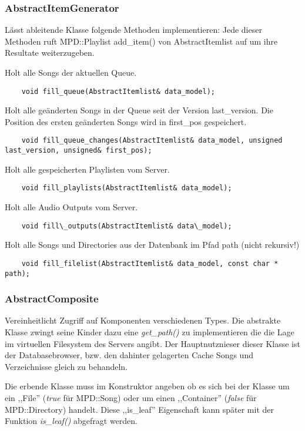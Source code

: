 
\subsubsection{AbstractItemGenerator}
Lässt ableitende Klasse folgende Methoden implementieren:
Jede dieser Methoden ruft MPD::Playlist add\_item() von AbstractItemlist auf um ihre Resultate weiterzugeben.

Holt alle Songs der aktuellen Queue.
\begin{verbatim}            
    void fill_queue(AbstractItemlist& data_model);
\end{verbatim}

Holt alle geänderten Songs in der Queue seit der Version last\_version. Die Position des ersten geänderten Songs wird in first\_pos gespeichert. 
\begin{verbatim}
    void fill_queue_changes(AbstractItemlist& data_model, unsigned last_version, unsigned& first_pos);
\end{verbatim}

Holt alle gespeicherten Playlisten vom Server.
\begin{verbatim}              
    void fill_playlists(AbstractItemlist& data_model);
\end{verbatim}

Holt alle Audio Outputs vom Server.
\begin{verbatim}
    void fill\_outputs(AbstractItemlist& data\_model);
\end{verbatim}

Holt alle Songs und Directories aus der Datenbank im Pfad path (nicht rekursiv!)              
\begin{verbatim}
    void fill_filelist(AbstractItemlist& data_model, const char * path);
\end{verbatim}



\subsubsection{AbstractComposite}
Vereinheitlicht Zugriff auf Komponenten verschiedenen Types.
Die abstrakte Klasse zwingt seine Kinder dazu eine \emph{get\_path()} zu implementieren die die Lage im virtuellen Filesystem des Servers angibt.
Der Hauptnutznieser dieser Klasse ist der Databasebrowser, bzw. den dahinter gelagerten Cache Songs und Verzeichnisse gleich zu behandeln.

Die erbende Klasse muss im Konstruktor angeben ob es sich bei der Klasse um ein ,,File'' (\emph{true} für MPD::Song) oder um einen ,,Container'' (\emph{false} für MPD::Directory) handelt.
Diese ,,is\_leaf'' Eigenschaft kann später mit der Funktion \emph{is\_leaf()} abgefragt werden.



